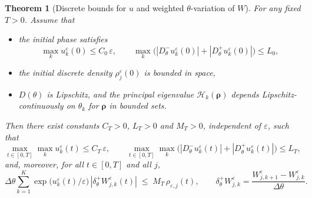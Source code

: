 \documentclass[11pt, dina4, amsfont12]{article}
\newtheorem{theorem}{Theorem}[section]
\begin{document}

\begin{theorem}[Discrete bounds for $u$ and weighted $\theta$-variation of $W$]\label{thm:uW_bounds_bootstrap}
For any fixed $T>0$. Assume that
\begin{itemize}
\item the initial phase satisfies
\[
\max_k u_k^\varepsilon(0)\le C_0\,\varepsilon,
\qquad
\max_{k}\Big(|D_\theta^-u_k^\varepsilon(0)|+|D_\theta^+u_k^\varepsilon(0)|\Big)\le L_0,
\]
\item the initial discrete density $\rho_j^\varepsilon(0)$ is bounded in space,
\item $D(\theta)$ is Lipschitz, and the principal eigenvalue
$\mathcal H_k(\boldsymbol\rho)$ depends Lipschitz-continuously on $\theta_k$
for $\boldsymbol\rho$ in bounded sets.
\end{itemize}
Then there exist constants $C_T>0$, $L_T>0$ and $M_T>0$, independent of
$\varepsilon$, such that
\begin{equation}\label{eq:u_bounds_global_T}
\max_{t\in[0,T]}\max_k u_k^\varepsilon(t)\le C_T\,\varepsilon,
\qquad
\max_{t\in[0,T]}\max_k\Big(|D_\theta^-u_k^\varepsilon(t)|+|D_\theta^+u_k^\varepsilon(t)|\Big)
\le L_T,
\end{equation}
and, moreover, for all $t\in[0,T]$ and all $j$,
\begin{equation}\label{eq:W_weighted_diff_global_T}
\Delta\theta\sum_{k=1}^K
\exp\!\big(u_k^\varepsilon(t)/\varepsilon\big)\,|\delta_\theta^+ W_{j,k}^\varepsilon(t)|
\;\le\;
M_T\,\rho_{\varepsilon,j}(t),
\qquad
\delta_\theta^+W_{j,k}^\varepsilon=\frac{W_{j,k+1}^\varepsilon-W_{j,k}^\varepsilon}{\Delta\theta}.
\end{equation}
\end{theorem}
\end{document}
